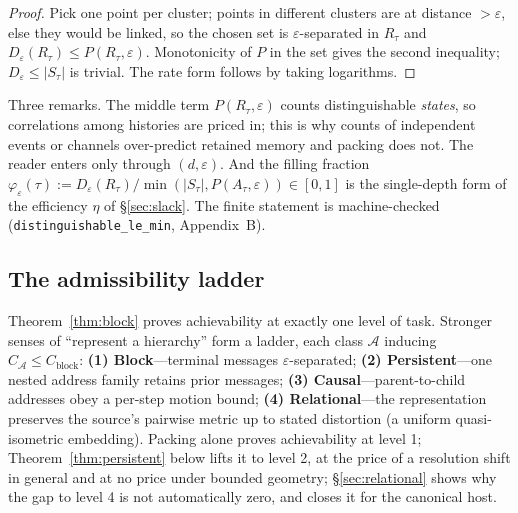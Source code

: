 \documentclass[11pt,reqno]{amsart}
\theoremstyle{plain}
\theoremstyle{definition}
\newcommand{\Cblock}{C_{\mathrm{block}}}
\newcommand{\eps}{\varepsilon}
\begin{document}
\begin{proof}
Pick one point per cluster; points in different clusters are at distance $>\eps$, else they would be linked, so the chosen set is $\eps$-separated in $R_\tau$ and $D_\eps(R_\tau)\le P(R_\tau,\eps)$. Monotonicity of $P$ in the set gives the second inequality; $D_\eps\le|S_\tau|$ is trivial. The rate form follows by taking logarithms.
\end{proof}

Three remarks. The middle term $P(R_\tau,\eps)$ counts distinguishable \emph{states}, so correlations among histories are priced in; this is why counts of independent events or channels over-predict retained memory and packing does not. The reader enters only through $(d,\eps)$. And the filling fraction $\varphi_\eps(\tau):=D_\eps(R_\tau)/\min(|S_\tau|,P(A_\tau,\eps))\in[0,1]$ is the single-depth form of the efficiency $\eta$ of \S\ref{sec:slack}. The finite statement is machine-checked (\texttt{distinguishable\_\allowbreak{}le\_\allowbreak{}min}, Appendix~B).

\subsection{The admissibility ladder}\label{sec:ladder}

Theorem~\ref{thm:block} proves achievability at exactly one level of task. Stronger senses of ``represent a hierarchy'' form a ladder, each class $\mathcal A$ inducing $C_{\mathcal A}\le\Cblock$: \textbf{(1) Block}---terminal messages $\eps$-separated; \textbf{(2) Persistent}---one nested address family retains prior messages; \textbf{(3) Causal}---parent-to-child addresses obey a per-step motion bound; \textbf{(4) Relational}---the representation preserves the source's pairwise metric up to stated distortion (a uniform quasi-isometric embedding). Packing alone proves achievability at level 1; Theorem~\ref{thm:persistent} below lifts it to level 2, at the price of a resolution shift in general and at no price under bounded geometry; \S\ref{sec:relational} shows why the gap to level 4 is not automatically zero, and closes it for the canonical host.
\end{document}

